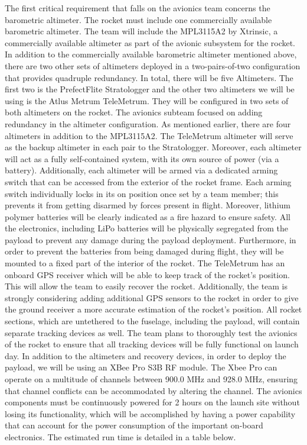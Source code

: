 The first critical requirement that falls on the avionics team concerns the barometric altimeter. The rocket must include one commercially available barometric altimeter. The team will include the MPL3115A2 by Xtrinsic, a commercially available altimeter as part of the avionic subsystem for the rocket. 
In addition to the commercially available barometric altimeter mentioned above, there are two other sets of altimeters deployed in a two-pairs-of-two configuration that provides quadruple redundancy. In total, there will be five Altimeters. The first two is the PrefectFlite Stratologger and the other two altimeters we will be using is the Atlus Metrum TeleMetrum. They will be configured in two sets of both altimeters on the rocket. The avionics subteam focused on adding redundancy in the altimeter configuration. As mentioned earlier, there are four altimeters in addition to the  MPL3115A2. The TeleMetrum altimeter will serve as the backup altimeter in each pair to the Stratologger. Moreover, each altimeter will act as a fully self-contained system, with its own source of power (via a battery). Additionally, each altimeter will be armed via a dedicated arming switch that can be accessed from the exterior of the rocket frame. Each arming switch individually locks in its on position once set by a team member; this prevents it from getting disarmed by forces present in flight. Moreover, lithium polymer batteries will be clearly indicated as a fire hazard to ensure safety. All the electronics, including LiPo batteries will be physically segregated from the payload to prevent any damage during the payload deployment. Furthermore, in order to prevent the batteries from being damaged during flight, they will be mounted to a fixed part of the interior of the rocket. 
The TeleMetrum has an onboard GPS receiver which will be able to keep track of the rocket’s position. This will allow the team to easily recover the rocket. Additionally, the team is strongly considering adding additional GPS sensors to the rocket in order to give the ground receiver a more accurate estimation of the rocket’s position. All rocket sections, which are untethered to the fuselage, including the payload, will contain separate tracking devices as well. The team plans to thoroughly test the avionics of the rocket to ensure that all tracking devices will be fully functional on launch day.
In addition to the altimeters and recovery devices, in order to deploy the payload, we will be using an XBee Pro S3B RF module. The Xbee Pro can operate on a multitude of channels between 900.0 MHz and 928.0 MHz, ensuring that channel conflicts can be accommodated by altering the channel. The avionics components must be continuously powered for 2 hours on the launch site without losing its functionality, which will be accomplished by having a power capability that can account for the power consumption of the important on-board electronics. The estimated run time is detailed in a table below.
